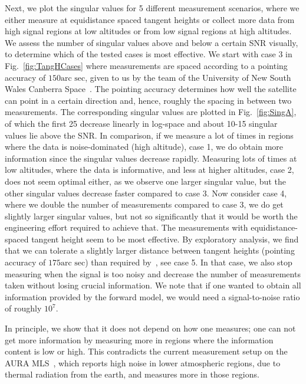 Next, we plot the singular values for 5 different measurement scenarios, where we either measure at equidistance spaced tangent heights or collect more data from high signal regions at low altitudes or from low signal regions at high altitudes.
We assess the number of singular values above and below a certain SNR visually, to determine which of the tested cases is most effective.
We start with case 3 in Fig.~\ref{fig:TangHCases} where measurements are spaced according to a pointing accuracy of $150\text{arc sec}$, given to us by the team of the University of New South Wales Canberra Space~\cite{CubeSatInternal}.
The pointing accuracy determines how well the satellite can point in a certain direction and, hence, roughly the spacing in between two measurements.
The corresponding singular values are plotted in Fig.~\ref{fig:SingA}, of which the first 25 decrease linearly in log-space and about 10-15 singular values lie above the SNR.
In comparison, if we measure a lot of times in regions where the data is noise-dominated (high altitude), case 1, we do obtain more information since the singular values decrease rapidly.
Measuring lots of times at low altitudes, where the data is informative, and less at higher altitudes, case 2, does not seem optimal either, as we observe one larger singular value, but the other singular values decrease faster compared to case 3.
Now consider case 4, where we double the number of measurements compared to case 3, we do get slightly larger singular values, but not so significantly that it would be worth the engineering effort required to achieve that.
The measurements with equidistance-spaced tangent height seem to be most effective.
By exploratory analysis, we find that we can tolerate a slightly larger distance between tangent heights (pointing accuracy of $175\text{arc sec}$) than required by~\cite{CubeSatInternal}, see case 5.
In that case, we also stop measuring when the signal is too noisy and decrease the number of measurements taken without losing crucial information.
We note that if one wanted to obtain all information provided by the forward model, we would need a signal-to-noise ratio of roughly $10^7$.

In principle, we show that it does not depend on how one measures; one can not get more information by measuring more in regions where the information content is low or high.
This contradicts the current measurement setup on the AURA MLS~\cite{livesey2006retrieval}, which reports high noise in lower atmospheric regions, due to thermal radiation from the earth, and measures more in those regions.

